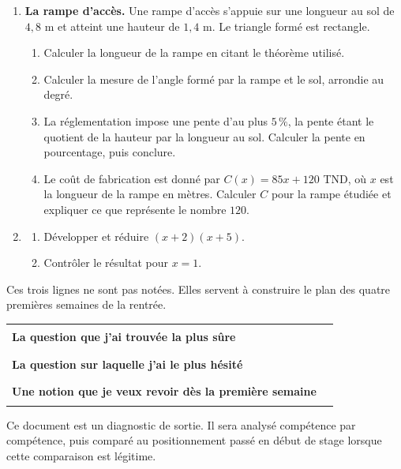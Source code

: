 \documentclass[10pt,a4paper]{article}
\begin{document}
\needspace{68mm}\par\vspace{3mm}
\begin{enumerate}
\needspace{22mm}
\item[\textbf{C1.}] \textbf{La rampe d'accès.} Une rampe d'accès s'appuie sur une longueur au sol de $4{,}8$ m
et atteint une hauteur de $1{,}4$ m. Le triangle formé est rectangle.
\begin{enumerate}
\item Calculer la longueur de la rampe en citant le théorème utilisé.
\item Calculer la mesure de l'angle formé par la rampe et le sol, arrondie au degré.
\item La réglementation impose une pente d'au plus $5\,\%$, la pente étant le quotient de la hauteur par la
longueur au sol. Calculer la pente en pourcentage, puis conclure.
\item Le coût de fabrication est donné par $C(x) = 85x + 120$ TND, où $x$ est la longueur de la rampe en mètres.
Calculer $C$ pour la rampe étudiée et expliquer ce que représente le nombre $120$.
\end{enumerate}
\par\vspace{1.2mm}
\needspace{22mm}
\item[\textbf{C2.}] \begin{enumerate}
\item Développer et réduire $(x + 2)(x + 5)$.
\item Contrôler le résultat pour $x = 1$.
\end{enumerate}
\par\vspace{1.2mm}
\end{enumerate}
\brouillon{\dimexpr\textheight/3\relax}
\newpage
{}
\begin{methodbox}Ces trois lignes ne sont pas notées. Elles servent à construire le plan des quatre premières semaines de la rentrée.\end{methodbox}
\par\noindent\begin{tabularx}{\linewidth}{>{\bfseries}p{62mm} X}
\toprule
La question que j'ai trouvée la plus sûre & \rule{85mm}{0.32pt} \\
La question sur laquelle j'ai le plus hésité & \rule{85mm}{0.32pt} \\
Une notion que je veux revoir dès la première semaine & \rule{85mm}{0.32pt} \\
\bottomrule\end{tabularx}
\vfill
\begin{graybox}\small Ce document est un diagnostic de sortie. Il sera analysé compétence par compétence, puis comparé au positionnement passé en début de stage lorsque cette comparaison est légitime.\end{graybox}
\end{document}
